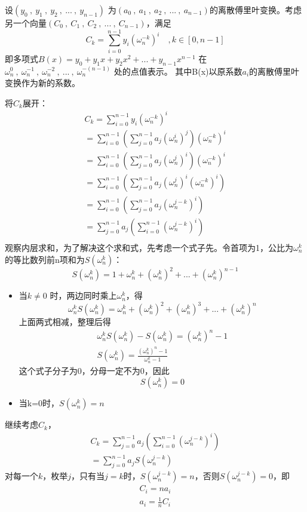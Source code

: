 设$(y_0\ ,\ y_1\ ,\ y_2\ ,\ ...\ ,\ y_{n-1})$ 为$(a_0\ ,\ a_1\ ,\ a_2\ ,\ ...\ ,\ a_{n-1})$的离散傅里叶变换。考虑另一个向量$(C_0\ ,\ C_1\ ,\ C_2\ ,\ ...\ ,\ C_{n-1})$，满足
$$
C_k=\sum_{i=0}^{n-1}y_i(\omega_n^{-k})^i   \quad,k\in [0,n-1]
$$
即多项式$B(x)=y_0+y_1x+y_2x^2+...+y_{n-1}x^{n-1}$ 在$\omega_n^0\ ,\ \omega_n^{-1}\ ,\ \omega_n^{-2}\ ,\ ...\ ,\ \omega_n^{-(n-1)}$ 处的点值表示。
其中{\heiti B(x)以原系数$a_i$的离散傅里叶变换作为新的系数。}

将$C_k$展开：
\begin{align*}
C_k=\sum_{i=0}^{n-1}y_i(\omega_n^{-k})^i \\
=\sum_{i=0}^{n-1} ( \sum_{j=0}^{n-1}a_j(\omega_n^i)^j )  (\omega_n^{-k})^i   \\
=\sum_{i=0}^{n-1} ( \sum_{j=0}^{n-1}a_j(\omega_n^j)^i )  (\omega_n^{-k})^i   \\
=\sum_{i=0}^{n-1} ( \sum_{j=0}^{n-1}a_j(\omega_n^j)^i (\omega_n^{-k})^i )     \\
=\sum_{i=0}^{n-1} ( \sum_{j=0}^{n-1}a_j(\omega_n^{j-k})^i  )     \\
=\sum_{j=0}^{n-1} a_j(\sum_{i=0}^{n-1}(\omega_n^{j-k})^i )      \\
\end{align*}
观察内层求和，为了解决这个求和式，先考虑一个式子先。令首项为1，公比为$\omega_n^k$的等比数列前n项和为$S(\omega_n^k)$：
$$
S(\omega_n^k)=1+\omega_n^k+(\omega_n^k)^2+...+(\omega_n^k)^{n-1}
$$
\begin{itemize}
\item 当$k\neq0$ 时，两边同时乘上$\omega_n^k$，得
$$
\omega_n^kS(\omega_n^k)=\omega_n^k+(\omega_n^k)^2+(\omega_n^k)^3+...+(\omega_n^k)^{n}
$$
上面两式相减，整理后得
\begin{align*}
\omega_n^kS(\omega_n^k)-S(\omega_n^k)=(\omega_n^k)^{n}-1 \\
S(\omega_n^k)=\frac{(\omega_n^k)^{n}-1 }{\omega_n^k-1}
\end{align*}
 这个式子分子为0，分母一定不为0，因此
$$
S(\omega_{n}^{k})=0
$$

\item 当k=0时，$S(\omega_{n}^{k})=n$
\end{itemize}

\vbox{}

继续考虑$C_k$，
\begin{align*}
C_k=\sum_{j=0}^{n-1} a_j(\sum_{i=0}^{n-1}(\omega_n^{j-k})^i ) \\
=\sum_{j=0}^{n-1} a_jS(\omega_{n}^{j-k})
\end{align*}
对每一个$k$，枚举$j$，只有当$j=k$时，$S(\omega_{n}^{j-k})=n$，否则$S(\omega_{n}^{j-k})=0$，即
\begin{align*}
C_i=na_i  \\
a_i=\frac{1}{n}C_i
\end{align*}

